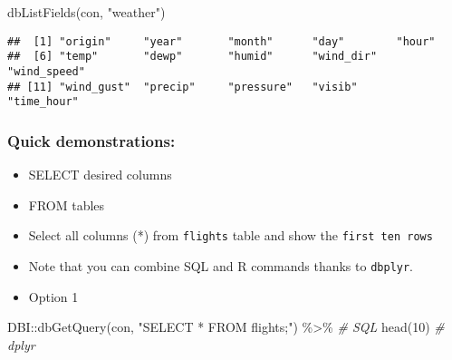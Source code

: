 \documentclass[
]{book}
\newenvironment{Shaded}{\begin{snugshade}}{\end{snugshade}}
\newcommand{\CommentTok}[1]{\textcolor[rgb]{0.56,0.35,0.01}{\textit{#1}}}
\newcommand{\DecValTok}[1]{\textcolor[rgb]{0.00,0.00,0.81}{#1}}
\newcommand{\FunctionTok}[1]{\textcolor[rgb]{0.00,0.00,0.00}{#1}}
\newcommand{\NormalTok}[1]{#1}
\newcommand{\SpecialCharTok}[1]{\textcolor[rgb]{0.00,0.00,0.00}{#1}}
\newcommand{\StringTok}[1]{\textcolor[rgb]{0.31,0.60,0.02}{#1}}
\begin{document}
\begin{Shaded}
\begin{Highlighting}[]
\FunctionTok{dbListFields}\NormalTok{(con, }\StringTok{"weather"}\NormalTok{)}
\end{Highlighting}
\end{Shaded}

\begin{verbatim}
##  [1] "origin"     "year"       "month"      "day"        "hour"      
##  [6] "temp"       "dewp"       "humid"      "wind_dir"   "wind_speed"
## [11] "wind_gust"  "precip"     "pressure"   "visib"      "time_hour"
\end{verbatim}

\hypertarget{quick-demonstrations}{%
\subsubsection{Quick demonstrations:}\label{quick-demonstrations}}

\begin{itemize}
\item
  SELECT desired columns
\item
  FROM tables
\item
  Select all columns (*) from \texttt{flights} table and show the \texttt{first\ ten\ rows}
\item
  Note that you can combine SQL and R commands thanks to \texttt{dbplyr}.
\item
  Option 1
\end{itemize}

\begin{Shaded}
\begin{Highlighting}[]
\NormalTok{DBI}\SpecialCharTok{::}\FunctionTok{dbGetQuery}\NormalTok{(con, }
                \StringTok{"SELECT * FROM flights;"}\NormalTok{) }\SpecialCharTok{\%\textgreater{}\%} \CommentTok{\# SQL}
  \FunctionTok{head}\NormalTok{(}\DecValTok{10}\NormalTok{) }\CommentTok{\# dplyr }
\end{Highlighting}
\end{Shaded}
\end{document}
